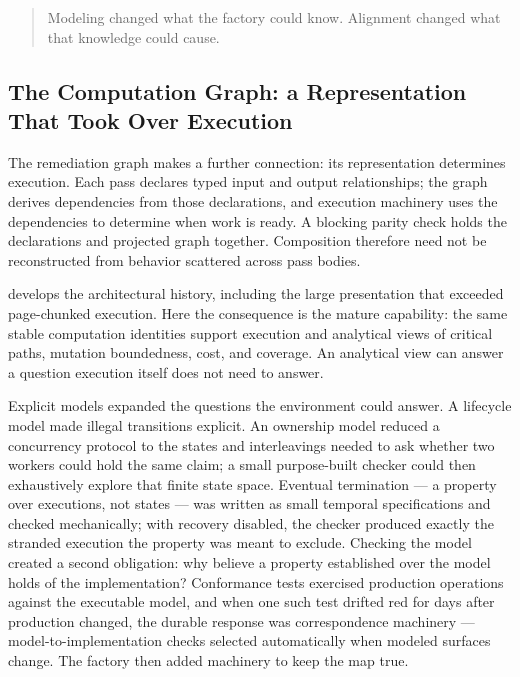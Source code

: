 
\begin{quote}
Modeling changed what the factory could know. Alignment changed what that knowledge could cause.
\end{quote}

\subsection{The Computation Graph: a Representation That Took Over Execution}\label{heading:the-computation-graph-a-representation-that-took-over-execution}


The remediation graph makes a further connection: its representation determines execution. Each pass declares typed input and output relationships; the graph derives dependencies from those declarations, and execution machinery uses the dependencies to determine when work is ready. A blocking parity check holds the declarations and projected graph together. Composition therefore need not be reconstructed from behavior scattered across pass bodies.

 develops the architectural history, including the large presentation that exceeded page-chunked execution. Here the consequence is the mature capability: the same stable computation identities support execution and analytical views of critical paths, mutation boundedness, cost, and coverage. An analytical view can answer a question execution itself does not need to answer.


Explicit models expanded the questions the environment could answer. A lifecycle model made illegal transitions explicit. An ownership model reduced a concurrency protocol to the states and interleavings needed to ask whether two workers could hold the same claim; a small purpose-built checker could then exhaustively explore that finite state space. Eventual termination --- a property over executions, not states --- was written as small temporal specifications and checked mechanically; with recovery disabled, the checker produced exactly the stranded execution the property was meant to exclude. Checking the model created a second obligation: why believe a property established over the model holds of the implementation? Conformance tests exercised production operations against the executable model, and when one such test drifted red for days after production changed, the durable response was correspondence machinery --- model-to-implementation checks selected automatically when modeled surfaces change. The factory then added machinery to keep the map true.

